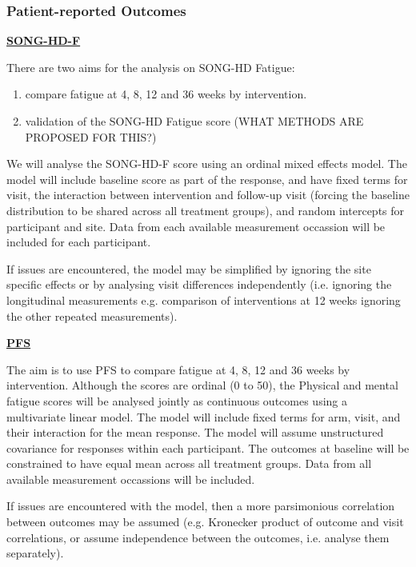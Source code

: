 \documentclass[11pt,parskip=half-]{scrartcl}
\providecommand{\tightlist}{%
  \setlength{\itemsep}{0pt}\setlength{\parskip}{0pt}}
\begin{document}
\subsubsection{Patient-reported Outcomes}\label{patient-reported-outcomes}

\label{analysis:song-hd-f}
\hyperref[outcome:song-hd-f]{\textbf{SONG-HD-F}}

There are two aims for the analysis on SONG-HD Fatigue:

\begin{enumerate}
  \tightlist
  \item compare fatigue at 4, 8, 12 and 36 weeks by intervention.
  \item validation of the SONG-HD Fatigue score (WHAT METHODS ARE PROPOSED FOR THIS?)
\end{enumerate}

We will analyse the SONG-HD-F score using an ordinal mixed effects model. The model will include baseline score as part of the response, and have fixed terms for visit,  the interaction between intervention and follow-up visit (forcing the baseline distribution to be shared across all treatment groups), and random intercepts for participant and site. Data from each available measurement occassion will be included for each participant.

If issues are encountered, the model may be simplified by ignoring the site specific effects or by analysing visit differences independently (i.e. ignoring the longitudinal measurements e.g. comparison of interventions at 12 weeks ignoring the other repeated measurements).

\label{analysis:pfs}
\hyperref[outcome:pfs]{\textbf{PFS}}

The aim is to use PFS to compare fatigue at 4, 8, 12 and 36 weeks by intervention. Although the scores are ordinal (0 to 50), the Physical and mental fatigue scores will be analysed jointly as continuous outcomes using a multivariate linear model. The model will include fixed terms for arm, visit, and their interaction for the mean response. The model will assume unstructured covariance for responses within each participant. The outcomes at baseline will be constrained to have equal mean across all treatment groups. Data from all available measurement occassions will be included.

If issues are encountered with the model, then a more parsimonious correlation between outcomes may be assumed (e.g. Kronecker product of outcome and visit correlations, or assume independence between the outcomes, i.e. analyse them separately).
\end{document}
